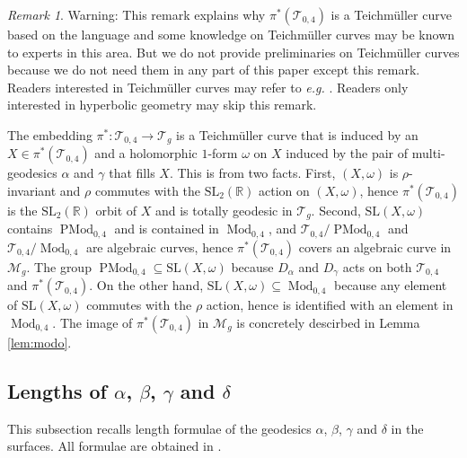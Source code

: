 \documentclass[UTF8]{amsart}
\numberwithin{equation}{section}
\theoremstyle{definition}
\theoremstyle{example}
\theoremstyle{remark}
\newtheorem{remark}[theorem]{Remark}
\DeclareMathOperator{\pmodo}{PMod}
\DeclareMathOperator{\modo}{Mod}
\begin{document}
\begin{remark}
 Warning: This remark explains why $\pi^{*}(\mathcal{T}_{0,4})$ is a Teichm\"uller curve based on the language and some knowledge on Teichm\"uller curves may be known to experts in this area. But we do not provide preliminaries on Teichm\"uller curves because we do not need them in any part of this paper except this remark. Readers interested in Teichm\"uller curves may refer to \emph{e.g.} \cite{mcmullen2023billiards, moller2011teichmuller}. Readers only interested in hyperbolic geometry may skip this remark. 

 The embedding $\pi^{*}:\mathcal{T}_{0,4}\to \mathcal{T}_g$ is a Teichm\"uller curve that is induced by an $X\in \pi^{*}(\mathcal{T}_{0,4})$ and a holomorphic $1$-form $\omega$ on $X$ induced by the pair of multi-geodesics $\alpha$ and $\gamma$ that fills $X$. This is from two facts. First, $(X, \omega)$ is $\rho$-invariant and $\rho$ commutes with the $\mathrm{SL}_2(\mathbb{R})$ action on $(X,\omega)$, hence $\pi^{*}(\mathcal{T}_{0,4})$ is the $\mathrm{SL}_2(\mathbb{R})$ orbit of $X$ and is totally geodesic in $\mathcal{T}_g$. Second, $\mathrm{SL}(X, \omega)$ contains $\pmodo_{0,4}$ and is contained in $\modo_{0,4}$, and $\mathcal{T}_{0,4}/\pmodo_{0,4}$ and $\mathcal{T}_{0,4}/\modo_{0,4}$ are algebraic curves, hence $\pi^{*}(\mathcal{T}_{0,4})$ covers an algebraic curve in $\mathcal{M}_g$. 
The group $\pmodo_{0,4}\subseteq  \mathrm{SL}(X, \omega)$ because $D_{\alpha}$ and $D_{\gamma}$ acts on both $\mathcal{T}_{0,4}$ and $\pi^{*}(\mathcal{T}_{0,4})$. 
On the other hand, $  \mathrm{SL}(X, \omega)\subseteq\modo_{0,4}$ because 
any element of  $\mathrm{SL}(X, \omega)$ commutes with the $\rho$ action, hence is identified with an element in $\modo_{0,4}$. 
  The image of $\pi^{*}(\mathcal{T}_{0,4})$ in $\mathcal{M}_g$ is concretely descirbed in Lemma \ref{lem:modo}. 
\end{remark}


\subsection{Lengths of $\alpha$, $\beta$, $\gamma$ and $\delta$}
This subsection recalls length formulae of the geodesics $\alpha$, $\beta$, $\gamma$ and $\delta$ in the surfaces. All formulae are obtained in \cite{gao2023maximal}. 
\end{document}
